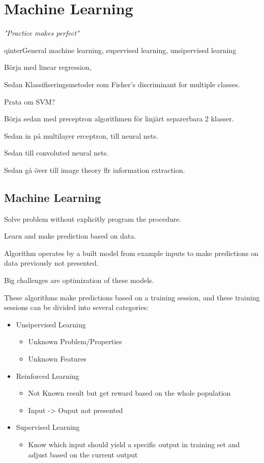 \chapter{Machine Learning}
\begin{center}
\vspace{-6ex}
\textit{"Practice makes perfect"}
\vspace{6ex}
\end{center}

qinterGeneral machine learning, supervised learning, unsipervised learning

Börja med linear regression,

Sedan Klassifiseringsmetoder som Fisher’s discriminant for multiple classes.

Prata om SVM?

Börja sedan med preceptron algorithmen för linjärt separerbara 2 klasser.

Sedan in på multilayer erceptron, till neural nets.

Sedan till convoluted neural nets.


Sedan gå över till image theory flr information extraction.


\section{Machine Learning}

Solve problem without explicitly program the procedure.

Learn and make prediction based on data.

Algorithm operates by a built model from example inputs to make predictions on data previously not presented.

Big challenges are optimization of these models.

These algorithms make predictions based on a training session, and these training sessions can be divided into several categories:

\begin{itemize}
\item Unsipervised Learning
	\begin{itemize}
	\item Unknown Problem/Properties
	\item Unknown Features
	\end{itemize}
\item Reinforced Learning
	\begin{itemize}
	\item Not Known result but get reward based on the whole population
	\item Input -> Ouput not presented
	\end{itemize}
\item Supervised Learning
	\begin{itemize}
	\item Know which input should yield a specific output in training set and adjust based on the current output
	\end{itemize}
\end{itemize}

